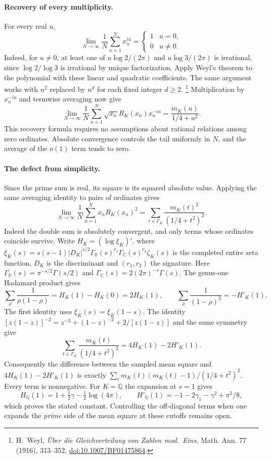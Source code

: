 \paragraph{Recovery of every multiplicity.}
For every real $u$,
\[
 \lim_{N\to\infty}\frac1N\sum_{n=1}^N x_n^{iu}
   =\begin{cases}1&u=0,\\0&u\ne0.\end{cases}
\]
Indeed, for $u\ne0$, at least one of $u\log2/(2\pi)$ and $u\log3/(2\pi)$ is
irrational, since $\log2/\log3$ is irrational by unique factorization. Apply
Weyl's theorem to the polynomial with these linear and quadratic
coefficients. The same argument works with $n^2$ replaced by $n^d$ for
each fixed integer $d\ge2$.
\footnote{H.~Weyl, \emph{\"Uber die Gleichverteilung von Zahlen mod.\ Eins},
Math. Ann. 77 (1916), 313--352, \href{https://doi.org/10.1007/BF01475864}{doi:10.1007/BF01475864}.}
Multiplication by $x_n^{-iu}$ and termwise averaging now give
\[
 \lim_{N\to\infty}\frac1N\sum_{n=1}^N
 \sqrt{x_n}R_K(x_n)x_n^{-iu}=\frac{m_K(u)}{1/4+u^2}.
\]
This recovery formula requires no assumptions about rational relations
among zero ordinates. Absolute convergence controls the tail uniformly in
$N$, and the average of the $o(1)$ term tends to zero.

\paragraph{The defect from simplicity.}
Since the prime sum is real, its square is its squared absolute value.
Applying the same averaging identity to pairs of ordinates gives
\[
 \lim_{N\to\infty}\frac1N\sum_{n=1}^N x_nR_K(x_n)^2
     =\sum_{t\in\Gamma_K}\frac{m_K(t)^2}{(1/4+t^2)^2}.
\]
Indeed the double sum is absolutely convergent, and only terms whose
ordinates coincide survive. Write $H_K=(\log\xi_K)'$, where
$\xi_K(s)=s(s-1)|D_K|^{s/2}\Gamma_{\mathbb R}(s)^{r_1}
\Gamma_{\mathbb C}(s)^{r_2}\zeta_K(s)$ is the completed entire zeta
function, $D_K$ is the discriminant and $(r_1,r_2)$ the signature.
Here $\Gamma_{\mathbb R}(s)=\pi^{-s/2}\Gamma(s/2)$ and
$\Gamma_{\mathbb C}(s)=2(2\pi)^{-s}\Gamma(s)$.
The genus-one Hadamard product gives
\[
 \sum_\rho\frac1{\rho(1-\rho)}
       =H_K(1)-H_K(0)=2H_K(1),\qquad
 \sum_\rho\frac1{(1-\rho)^2}=-H'_K(1).
\]
The first identity uses $\xi_K(s)=\xi_K(1-s)$.
The identity
$[z(1-z)]^{-2}=z^{-2}+(1-z)^{-2}+2/[z(1-z)]$ and the same symmetry give
\[
 \sum_{t\in\Gamma_K}\frac{m_K(t)}{(1/4+t^2)^2}
      =4H_K(1)-2H'_K(1).
\]
Consequently the difference between the sampled mean square and
$4H_K(1)-2H'_K(1)$ is exactly
$\sum_t m_K(t)(m_K(t)-1)/(1/4+t^2)^2$. Every term is nonnegative.
For $K=\mathbb Q$ the expansion at $s=1$ gives
\[
 H_{\mathbb Q}(1)=1+\tfrac12\gamma-\tfrac12\log(4\pi),\qquad
 H'_{\mathbb Q}(1)=-1-2\gamma_1-\gamma^2+\pi^2/8,
\]
which proves the stated constant. Controlling the off-diagonal terms when
one expands the \emph{prime} side of the mean square at these cutoffs
remains open.

